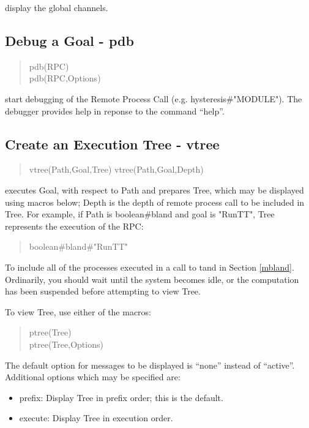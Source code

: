\noindent
display the global channels.

\subsection{Debug a Goal - pdb}

\begin{verse}
    pdb(RPC) \\
    pdb(RPC,Options)
\end{verse}

\noindent
start debugging of the Remote Process Call (e.g. hysteresis\#"MODULE").
The debugger provides help in reponse to the command ``help''.

\subsection{Create an Execution Tree - vtree}

\begin{verse}
    vtree(Path,Goal,Tree)
    vtree(Path,Goal,Depth)
\end{verse}

\noindent
executes Goal, with respect to Path and prepares Tree, which may be
displayed using macros below; Depth is the depth of remote
process call to be included in Tree.
For example, if Path is boolean\#bland
and goal is "RunTT", Tree represents the execution of the RPC:

\begin{verse}
    boolean\#bland\#"RunTT"
\end{verse}

To include all of the processes executed in a call to tand
in Section \ref{mbland}.
\noindent
Ordinarily, you should wait until the system becomes idle, or the
computation has been suspended before attempting to view Tree.

\noindent
To view Tree, use either of the macros:

\begin{verse}
    ptree(Tree) \\
    ptree(Tree,Options)
\end{verse}

\noindent
The default option for messages to be displayed is ``none'' instead
of ``active''.  Additional options which may be specified are:

\begin{itemize}
\item prefix:   Display Tree in prefix order; this is the default.
\item execute:  Display Tree in execution order.
\end{itemize}


